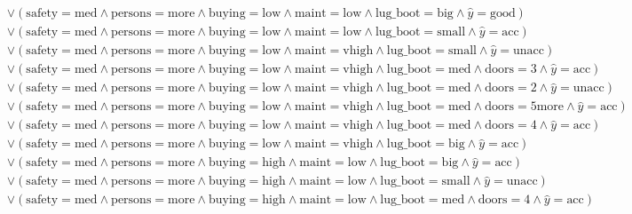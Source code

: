 \begin{scriptsize}
\[\begin{aligned}
  \\ & \lor (\text{safety}=\text{med} \land \text{persons}=\text{more} \land \text{buying}=\text{low} \land \text{maint}=\text{low} \land \text{lug_boot}=\text{big} \land \hat{y}=\text{good})
  \\ & \lor (\text{safety}=\text{med} \land \text{persons}=\text{more} \land \text{buying}=\text{low} \land \text{maint}=\text{low} \land \text{lug_boot}=\text{small} \land \hat{y}=\text{acc})
  \\ & \lor (\text{safety}=\text{med} \land \text{persons}=\text{more} \land \text{buying}=\text{low} \land \text{maint}=\text{vhigh} \land \text{lug_boot}=\text{small} \land \hat{y}=\text{unacc})
  \\ & \lor (\text{safety}=\text{med} \land \text{persons}=\text{more} \land \text{buying}=\text{low} \land \text{maint}=\text{vhigh} \land \text{lug_boot}=\text{med} \land \text{doors}=\text{3} \land \hat{y}=\text{acc})
  \\ & \lor (\text{safety}=\text{med} \land \text{persons}=\text{more} \land \text{buying}=\text{low} \land \text{maint}=\text{vhigh} \land \text{lug_boot}=\text{med} \land \text{doors}=\text{2} \land \hat{y}=\text{unacc})
  \\ & \lor (\text{safety}=\text{med} \land \text{persons}=\text{more} \land \text{buying}=\text{low} \land \text{maint}=\text{vhigh} \land \text{lug_boot}=\text{med} \land \text{doors}=\text{5more} \land \hat{y}=\text{acc})
  \\ & \lor (\text{safety}=\text{med} \land \text{persons}=\text{more} \land \text{buying}=\text{low} \land \text{maint}=\text{vhigh} \land \text{lug_boot}=\text{med} \land \text{doors}=\text{4} \land \hat{y}=\text{acc})
  \\ & \lor (\text{safety}=\text{med} \land \text{persons}=\text{more} \land \text{buying}=\text{low} \land \text{maint}=\text{vhigh} \land \text{lug_boot}=\text{big} \land \hat{y}=\text{acc})
  \\ & \lor (\text{safety}=\text{med} \land \text{persons}=\text{more} \land \text{buying}=\text{high} \land \text{maint}=\text{low} \land \text{lug_boot}=\text{big} \land \hat{y}=\text{acc})
  \\ & \lor (\text{safety}=\text{med} \land \text{persons}=\text{more} \land \text{buying}=\text{high} \land \text{maint}=\text{low} \land \text{lug_boot}=\text{small} \land \hat{y}=\text{unacc})
  \\ & \lor (\text{safety}=\text{med} \land \text{persons}=\text{more} \land \text{buying}=\text{high} \land \text{maint}=\text{low} \land \text{lug_boot}=\text{med} \land \text{doors}=\text{4} \land \hat{y}=\text{acc})

\end{aligned}\]
\end{scriptsize}
